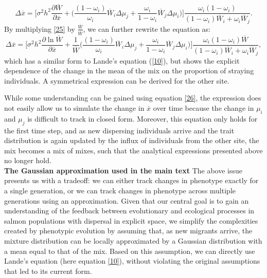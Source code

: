 \documentclass{revtex4}
\begin{document}
\begin{equation}\label{25}
\Delta\overline{x}=\Big[ \sigma^{2}h^{2}\frac{\partial \overline{W}}{\partial \overline{x}} + \Big(\frac{(1-\omega_i)}{\omega_i}\overline{W}_{i}\Delta\mu_{j}+\frac{\omega_i}{1-\omega_i}\overline{W}_{j}\Delta\mu_{i} \Big) \Big] \frac{\omega_i(1-\omega_i)}{(1-\omega_i)\overline{W}_{i}+\omega_i\overline{W}_{j}}.
\end{equation}
By multiplying \ref{25} by $\frac{\overline{W}}{\overline{W}}$, we can further rewrite the equation as:
\begin{equation}\label{26}
\Delta\overline{x}=\Big[ \sigma^{2}h^{2}\frac{\partial \ln\overline{W}}{\partial \overline{x}} + \frac{1}{\overline{W}}\Big(\frac{(1-\omega_i)}{\omega_i}\overline{W}_{i}\Delta\mu_{j}+\frac{\omega_i}{1-\omega_i}\overline{W}_{j}\Delta\mu_{i} \Big) \Big] \frac{\omega_i(1-\omega_i)\overline{W}}{(1-\omega_i)\overline{W}_{i}+\omega_i\overline{W}_{j}},
\end{equation}
which has a similar form to Lande's equation (\ref{10}), but shows the explicit dependence of the change in the mean of the mix on the proportion of straying individuals. A symmetrical expression can be derived for the other site. 

While some understanding can be gained using equation \ref{26}, the expression does not easily allow us to simulate the change in $\overline{x}$ over time because the change in $\mu_{i}$ and $\mu_{j}$ is difficult to track in closed form. Moreover, this equation only holds for the first time step, and as new dispersing individuals arrive and the trait distribution is again updated by the influx of individuals from the other site, the mix becomes a mix of mixes, such that the analytical expressions presented above no longer hold. \\

\textbf{The Gaussian approximation used in the main text}
The above issue presents us with a tradeoff: we can either track changes in phenotype exactly for a single generation, or we can track changes in phenotype across multiple generations using an approximation. Given that our central goal is to gain an understanding of the feedback between evolutionary and ecological processes in salmon populations with dispersal in explicit space, we simplify the complexities created by phenotypic evolution by assuming that, as new migrants arrive, the mixture distribution can be locally approximated by a Gaussian distribution with a mean equal to that of the mix. Based on this assumption, we can directly use Lande's equation (here equation \ref{10}), without violating the original assumptions that led to its current form. 
\end{document}
